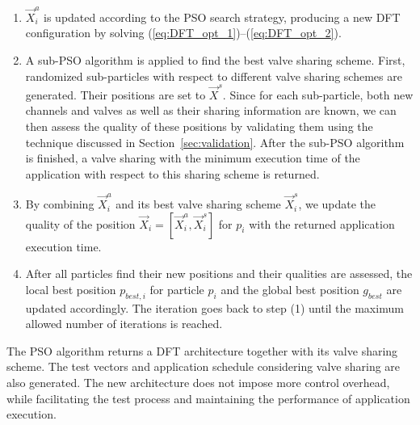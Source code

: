 \begin{enumerate} 

    \setlength\mylength{\parskip}
    \setlength\parskip{-3.5mm}
  \item 

  $\vec{X}^{a}_i$ is updated according to the PSO search strategy, producing a
  new DFT configuration by solving (\ref{eq:DFT_opt_1})--(\ref{eq:DFT_opt_2}).
  \setlength\parskip{\mylength}

  \item 
  A sub-PSO algorithm is applied to find the best valve sharing scheme. 
  First, randomized sub-particles with respect to different valve sharing schemes
  are generated. Their positions are set to $\vec{X}^{s}$. 
  Since for each sub-particle, both new channels and valves as well as their
  sharing information are known, we can then assess the quality of these
  positions by validating them using the technique discussed in 
  Section~\ref{sec:validation}. After the sub-PSO algorithm is finished, 
  a valve sharing with the minimum execution time of the application 
  with respect to this sharing scheme is returned. 
  

  \item 

  By combining $\vec{X}^{a}_i$ and its best valve sharing scheme
  $\vec{X}^{s}_i$, we update the quality of the position 
  $\vec{X}_i = [\vec{X}^{a}_i, \vec{X}^{s}_i]$ for $p_i$ with the returned
  application execution time. 

  \item 
    
  After all particles find their new positions and their qualities are assessed,
  the local best position $p_{best,i}$ for particle $p_i$ and the 
  global best position $g_{best}$ are updated accordingly. The iteration goes
  back to step (1) until the maximum allowed number of iterations is reached.

\end{enumerate}

The PSO algorithm returns a DFT architecture together with its valve sharing
scheme. The test vectors and application schedule considering valve sharing
are also generated. The new architecture does not impose
more control overhead, while facilitating the test process and maintaining 
the performance of application execution.

